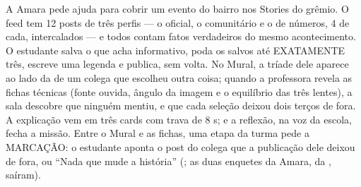 A Amara pede ajuda para cobrir um evento do bairro nos Stories do grêmio. O feed
tem 12 posts de três perfis --- o oficial, o comunitário e o de números, 4 de
cada, intercalados --- e todos contam fatos verdadeiros do mesmo acontecimento.
O estudante salva o que acha informativo, poda os salvos até EXATAMENTE três,
escreve uma legenda e publica, sem volta. No Mural, a tríade dele aparece ao lado
da de um colega que escolheu outra coisa; quando a professora revela as fichas
técnicas (fonte ouvida, ângulo da imagem e o equilíbrio das três lentes), a sala
descobre que ninguém mentiu, e que cada seleção deixou dois terços de fora. A
explicação vem em três cards com trava de 8 s; e a reflexão, na voz da escola,
fecha a missão. Entre o Mural e as fichas, uma etapa da turma pede a MARCAÇÃO:
o estudante aponta o post do colega que a publicação dele deixou de fora, ou
\enquote{Nada que mude a história} (; as duas enquetes da Amara,
da , saíram).

